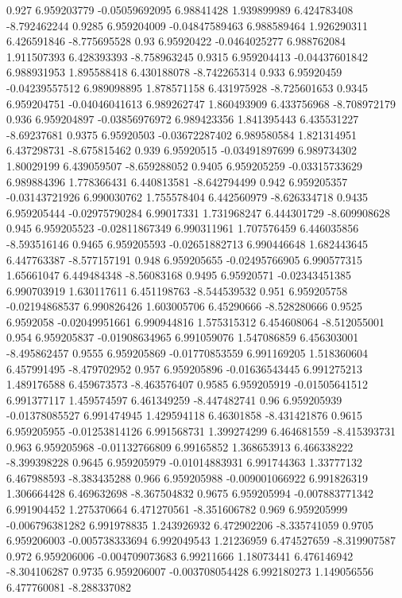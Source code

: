 {0.927 6.959203779 -0.05059692095 6.98841428 1.939899989 6.424783408 -8.792462244
0.9285 6.959204009 -0.04847589463 6.988589464 1.926290311 6.426591846 -8.775695528
0.93 6.95920422 -0.0464025277 6.988762084 1.911507393 6.428393393 -8.758963245
0.9315 6.959204413 -0.04437601842 6.988931953 1.895588418 6.430188078 -8.742265314
0.933 6.95920459 -0.04239557512 6.989098895 1.878571158 6.431975928 -8.725601653
0.9345 6.959204751 -0.04046041613 6.989262747 1.860493909 6.433756968 -8.708972179
0.936 6.959204897 -0.03856976972 6.989423356 1.841395443 6.435531227 -8.69237681
0.9375 6.95920503 -0.03672287402 6.989580584 1.821314951 6.437298731 -8.675815462
0.939 6.95920515 -0.03491897699 6.989734302 1.80029199 6.439059507 -8.659288052
0.9405 6.959205259 -0.03315733629 6.989884396 1.778366431 6.440813581 -8.642794499
0.942 6.959205357 -0.03143721926 6.990030762 1.755578404 6.442560979 -8.626334718
0.9435 6.959205444 -0.02975790284 6.99017331 1.731968247 6.444301729 -8.609908628
0.945 6.959205523 -0.02811867349 6.990311961 1.707576459 6.446035856 -8.593516146
0.9465 6.959205593 -0.02651882713 6.990446648 1.682443645 6.447763387 -8.577157191
0.948 6.959205655 -0.02495766905 6.990577315 1.65661047 6.449484348 -8.56083168
0.9495 6.95920571 -0.02343451385 6.990703919 1.630117611 6.451198763 -8.544539532
0.951 6.959205758 -0.02194868537 6.990826426 1.603005706 6.45290666 -8.528280666
0.9525 6.9592058 -0.02049951661 6.990944816 1.575315312 6.454608064 -8.512055001
0.954 6.959205837 -0.01908634965 6.991059076 1.547086859 6.456303001 -8.495862457
0.9555 6.959205869 -0.01770853559 6.991169205 1.518360604 6.457991495 -8.479702952
0.957 6.959205896 -0.01636543445 6.991275213 1.489176588 6.459673573 -8.463576407
0.9585 6.959205919 -0.01505641512 6.991377117 1.459574597 6.461349259 -8.447482741
0.96 6.959205939 -0.01378085527 6.991474945 1.429594118 6.46301858 -8.431421876
0.9615 6.959205955 -0.01253814126 6.991568731 1.399274299 6.464681559 -8.415393731
0.963 6.959205968 -0.01132766809 6.99165852 1.368653913 6.466338222 -8.399398228
0.9645 6.959205979 -0.01014883931 6.991744363 1.33777132 6.467988593 -8.383435288
0.966 6.959205988 -0.009001066922 6.991826319 1.306664428 6.469632698 -8.367504832
0.9675 6.959205994 -0.007883771342 6.991904452 1.275370664 6.471270561 -8.351606782
0.969 6.959205999 -0.006796381282 6.991978835 1.243926932 6.472902206 -8.335741059
0.9705 6.959206003 -0.005738333694 6.992049543 1.21236959 6.474527659 -8.319907587
0.972 6.959206006 -0.004709073683 6.99211666 1.18073441 6.476146942 -8.304106287
0.9735 6.959206007 -0.003708054428 6.992180273 1.149056556 6.477760081 -8.288337082
}
